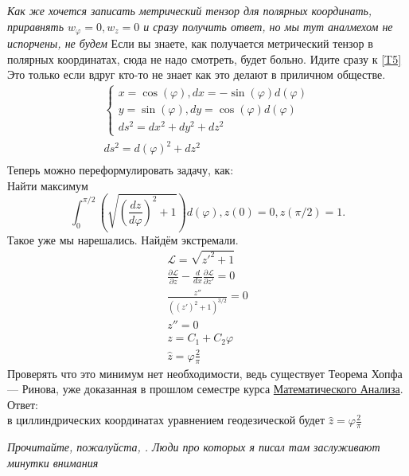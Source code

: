 \documentclass{article}
\newcommand{\Lagr}{\mathcal{L}}
\begin{document}
 \textcolor[rgb]{0.480469,0.566406,0.480469}{\textit{Как же хочется записать метрический тензор для полярных координать, приравнять $w_{\varphi}=0,w_{z}=0$ и сразу получить ответ, но мы тут аналмехом не испорчены, не будем}}
 Если вы знаете, как получается метрический тензор в полярных координатах, сюда не надо смотреть, будет больно. Идите сразу к \ref{T5} Это только если вдруг кто-то не знает как это делают в приличном обществе.
 \begin{gather*}
 \begin{cases}
     x=\cos{(\varphi)} ,
     dx = -\sin{(\varphi)} d(\varphi)\\
     y=\sin{(\varphi)} ,
     dy = \cos{(\varphi)} d(\varphi)\\
     ds^2=dx^2+dy^2+dz^2
 \end{cases}\\
    ds^2=d(\varphi)^2+dz^2\\
 \end{gather*} 
    Теперь можно переформулировать задачу, как:\\
    Найти максимум 
\begin{equation}\label{T5}
    \int_0^{\pi / 2} \left( \sqrt{\left(\frac{d z}{d \varphi} \right)^2+1} \right)  d(\varphi) ,z(0)=0,z(\pi/2)=1.
\end{equation}                                              
Такое уже мы нарешались.
Найдём экстремали.
\begin{gather*}
    \Lagr = \sqrt{z'^2+1}\\
     \frac{\partial \Lagr}{\partial z}  - \frac{d }{d x} \frac{\partial \Lagr}{\partial z'} =0 \\
     \frac{z''}{\left((z')^2+1\right)^{3/2}}=0\\
     z''=0\\
     z=C_1+C_2 \varphi\\
     \hat z = \varphi \frac{2}{\pi}
\end{gather*}
Проверять что это минимум нет необходимости, ведь существует Теорема Хопфа — Ринова, уже доказанная в прошлом семестре курса \href{http://rkarasev.ru/common/upload/an_explanations.pdf}{Математического Анализа}. \\
Ответ:\\
в циллиндрических координатах уравнением геодезической будет $ \hat z = \varphi \frac{2}{\pi}$

 \textcolor[rgb]{0.480469,0.566406,0.480469}{\textit{Прочитайте, пожалуйста, \hyperref[thxs]{}. Люди про которых я писал там заслуживают минутки внимания}}                                               
\end{document}
